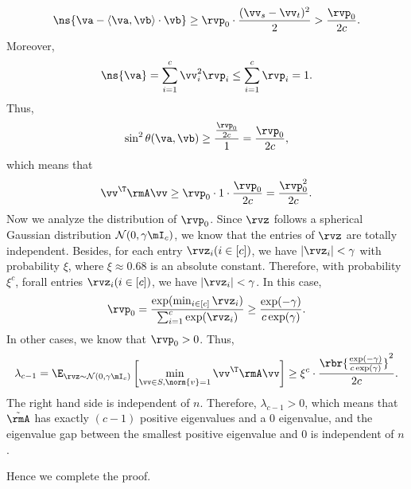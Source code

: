 \begin{proofof}{}
\begin{equation}
\ns{\va-\langle \va,\vb\rangle\cdot \vb} \geq \rvp_0\cdot \frac{(\vv_s-\vv_t)^2}{2} > \frac{\rvp_0}{2c}.
\end{equation}
Moreover,
\begin{equation}
\ns{\va} = \sum_{i=1}^c \vv_i^2\rvp_i \leq \sum_{i=1}^c \rvp_i = 1.
\end{equation}
Thus,
\begin{equation}
\sin^2\theta(\va,\vb) \geq \frac{\frac{\rvp_0}{2c}}{1} = \frac{\rvp_0}{2c},
\end{equation}
which means that
\begin{equation}
\vv^\T\rmA\vv \geq \rvp_0\cdot 1\cdot\frac{\rvp_0}{2c} = \frac{\rvp_0^2}{2c}.
\end{equation}
Now we analyze the distribution of $\rvp_0$. Since $\rvz$ follows a spherical Gaussian distribution $\mathcal{N}(0,\gamma \mI_c)$, we know that the entries of $\rvz$ are totally independent. Besides, for each entry $\rvz_i(i\in[c])$, we have $|\rvz_i|<\gamma$ with probability $\xi$, where $\xi\approx 0.68$ is an absolute constant. Therefore, with probability $\xi^c$, forall entries $\rvz_i(i\in[c])$, we have $|\rvz_i|<\gamma$. In this case,
\begin{equation}
\rvp_0 = \frac{\exp(\min_{i\in[c]}\rvz_i)}{\sum_{i=1}^c\exp(\rvz_i)}\geq\frac{\exp(-\gamma)}{c\exp(\gamma)}.
\end{equation}
In other cases, we know that $\rvp_0>0$. Thus,
\begin{equation}
\label{lower-bound-c-1-eigenvalue-of-A}
\lambda_{c-1} = \E_{\rvz\sim\mathcal{N}(0,\gamma \mI_c)}\left[\min_{\vv\in S, \norm{v}=1}\vv^\T\rmA\vv\right]\geq \xi^c\cdot\frac{\rbr{\frac{\exp(-\gamma)}{c\exp(\gamma)}}^2}{2c}.
\end{equation}
The right hand side is independent of $n$. Therefore, $\lambda_{c-1}>0$, which means that $\tilde{\rmA}$ has exactly $(c-1)$ positive eigenvalues and a $0$ eigenvalue, and the eigenvalue gap between the smallest positive eigenvalue and 0 is independent of $n$.

Hence we complete the proof.

\end{proofof}